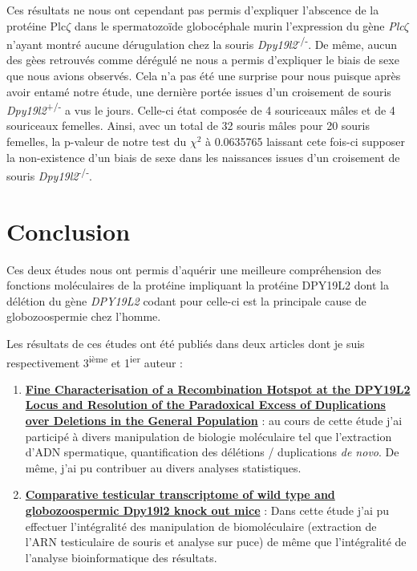 \documentclass[12pt,twoside]{reedthesis}
\providecommand{\tightlist}{%
  \setlength{\itemsep}{0pt}\setlength{\parskip}{0pt}}
\theoremstyle{definition}
\theoremstyle{definition}
\theoremstyle{remark}
\begin{document}
  Ces résultats ne nous ont cependant pas permis d'expliquer l'abscence de
  la protéine Plc\(\zeta\) dans le spermatozoïde globocéphale murin
  l'expression du gène \emph{Plc}\(\zeta\) n'ayant montré aucune
  dérugulation chez la souris \emph{Dpy19l2}\textsuperscript{-/-}. De
  même, aucun des gèes retrouvés comme dérégulé ne nous a permis
  d'expliquer le biais de sexe que nous avions observés. Cela n'a pas été
  une surprise pour nous puisque après avoir entamé notre étude, une
  dernière portée issues d'un croisement de souris
  \emph{Dpy19l2}\textsuperscript{+/-} a vus le jours. Celle-ci état
  composée de 4 souriceaux mâles et de 4 souriceaux femelles. Ainsi, avec
  un total de 32 souris mâles pour 20 souris femelles, la p-valeur de
  notre test du \(\chi^2\) à 0.0635765 laissant cete fois-ci supposer la
  non-existence d'un biais de sexe dans les naissances issues d'un
  croisement de souris \emph{Dpy19l2}\textsuperscript{-/-}.
  
  \section{Conclusion}\label{conclusion}
  
  Ces deux études nous ont permis d'aquérir une meilleure compréhension
  des fonctions moléculaires de la protéine impliquant la protéine DPY19L2
  dont la délétion du gène \emph{DPY19L2} codant pour celle-ci est la
  principale cause de globozoospermie chez l'homme.
  
  Les résultats de ces études ont été publiés dans deux articles dont je
  suis respectivement 3\textsuperscript{ième} et 1\textsuperscript{ier}
  auteur :
  
  \begin{enumerate}
  \def\labelenumi{\arabic{enumi}.}
  \tightlist
  \item
    \protect\hyperlink{mecamut}{\textbf{Fine Characterisation of a
    Recombination Hotspot at the DPY19L2 Locus and Resolution of the
    Paradoxical Excess of Duplications over Deletions in the General
    Population}} : au cours de cette étude j'ai participé à divers
    manipulation de biologie moléculaire tel que l'extraction d'ADN
    spermatique, quantification des délétions / duplications \emph{de
    novo}. De même, j'ai pu contribuer au divers analyses statistiques.\\
  \item
    \protect\hyperlink{transcriptome}{\textbf{Comparative testicular
    transcriptome of wild type and globozoospermic Dpy19l2 knock out
    mice}} : Dans cette étude j'ai pu effectuer l'intégralité des
    manipulation de biomoléculaire (extraction de l'ARN testiculaire de
    souris et analyse sur puce) de même que l'intégralité de l'analyse
    bioinformatique des résultats.
  \end{enumerate}
  
\end{document}
